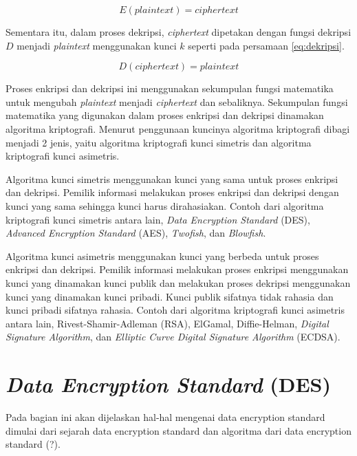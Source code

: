 \begin{equation}
	E(plaintext) = ciphertext
	\label{eq:enkripsi}
\end{equation}

Sementara itu, dalam proses dekripsi, \textit{ciphertext} dipetakan dengan fungsi dekripsi \begin{math}D\end{math} menjadi \textit{plaintext} menggunakan kunci \begin{math}k\end{math} seperti pada persamaan \ref{eq:dekripsi}.

\begin{equation}
	D(ciphertext) = plaintext
	\label{eq:dekripsi}
\end{equation}

Proses enkripsi dan dekripsi ini menggunakan sekumpulan fungsi matematika untuk mengubah \textit{plaintext} menjadi \textit{ciphertext} dan sebaliknya. Sekumpulan fungsi matematika yang digunakan dalam proses enkripsi dan dekripsi dinamakan algoritma kriptografi. Menurut penggunaan kuncinya algoritma kriptografi dibagi menjadi 2 jenis, yaitu algoritma kriptografi kunci simetris dan algoritma kriptografi kunci asimetris.

Algoritma kunci simetris menggunakan kunci yang sama untuk proses enkripsi dan dekripsi. Pemilik informasi melakukan proses enkripsi dan dekripsi dengan kunci yang sama sehingga kunci harus dirahasiakan. Contoh dari algoritma kriptografi kunci simetris antara lain, \textit{Data Encryption Standard} (DES), \textit{Advanced Encryption Standard} (AES), \textit{Twofish}, dan \textit{Blowfish}.

Algoritma kunci asimetris menggunakan kunci yang berbeda untuk proses enkripsi dan dekripsi. Pemilik informasi melakukan proses enkripsi menggunakan kunci yang dinamakan kunci publik dan melakukan proses dekripsi menggunakan kunci yang dinamakan kunci pribadi. Kunci publik sifatnya tidak rahasia dan kunci pribadi sifatnya rahasia. Contoh dari algoritma kriptografi kunci asimetris antara lain, Rivest-Shamir-Adleman (RSA), ElGamal, Diffie-Helman, \textit{Digital Signature Algorithm}, dan \textit{Elliptic Curve Digital Signature Algorithm} (ECDSA).

\section{\textit{Data Encryption Standard} (DES)}

Pada bagian ini akan dijelaskan hal-hal mengenai data encryption standard dimulai dari sejarah data encryption standard dan algoritma dari data encryption standard (?).

